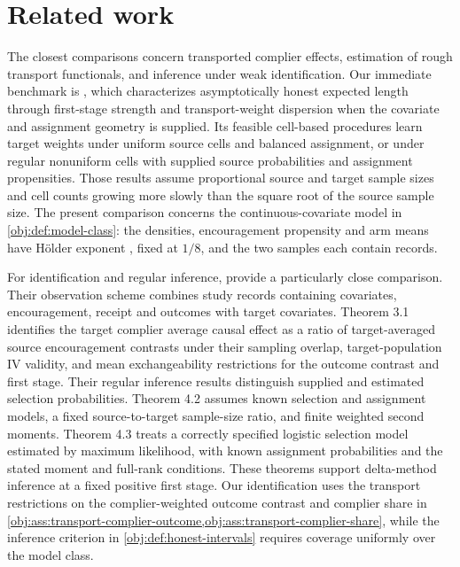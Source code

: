\section{Related work}
\label{sec:related-work}

The closest comparisons concern transported complier effects, estimation of rough transport functionals, and inference under weak identification. Our immediate benchmark is \citet{CausalSmith2026TransportedLATEStrengthFrontier}, which characterizes asymptotically honest expected length through first-stage strength and transport-weight dispersion when the covariate and assignment geometry is supplied. Its feasible cell-based procedures learn target weights under uniform source cells and balanced assignment, or under regular nonuniform cells with supplied source probabilities and assignment propensities. Those results assume proportional source and target sample sizes and cell counts growing more slowly than the square root of the source sample size. The present comparison concerns the continuous-covariate model in \cref{obj:def:model-class}: the densities, encouragement propensity and arm means have Hölder exponent , fixed at \(1/8\), and the two samples each contain  records.

For identification and regular inference, \citet[Theorems 3.1, 4.2 and 4.3]{ChenHuang2025Generalizing} provide a particularly close comparison. Their observation scheme combines study records containing covariates, encouragement, receipt and outcomes with target covariates. Theorem 3.1 identifies the target complier average causal effect as a ratio of target-averaged source encouragement contrasts under their sampling overlap, target-population IV validity, and mean exchangeability restrictions for the outcome contrast and first stage. Their regular inference results distinguish supplied and estimated selection probabilities. Theorem 4.2 assumes known selection and assignment models, a fixed source-to-target sample-size ratio, and finite weighted second moments. Theorem 4.3 treats a correctly specified logistic selection model estimated by maximum likelihood, with known assignment probabilities and the stated moment and full-rank conditions. These theorems support delta-method inference at a fixed positive first stage. Our identification uses the transport restrictions on the complier-weighted outcome contrast and complier share in \cref{obj:ass:transport-complier-outcome,obj:ass:transport-complier-share}, while the inference criterion in \cref{obj:def:honest-intervals} requires coverage uniformly over the model class.

